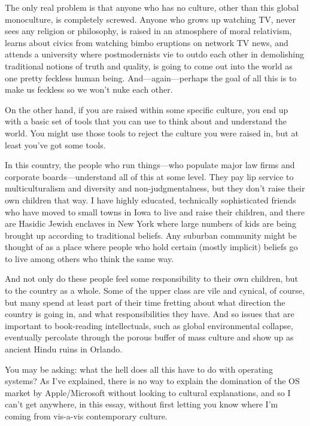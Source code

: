 \documentclass[
  fontsize=11pt,
  paper=landscape,
  twocolumn=true,
  pagesize=pdftex,
  headings=small,
  DIV=15,
  ]{scrartcl}
\begin{document}
The only real problem is that anyone who has no culture, other than this
global monoculture, is completely screwed. Anyone who grows up watching
TV, never sees any religion or philosophy, is raised in an atmosphere of
moral relativism, learns about civics from watching bimbo eruptions on
network TV news, and attends a university where postmodernists vie to
outdo each other in demolishing traditional notions of truth and
quality, is going to come out into the world as one pretty feckless
human being. And---again---perhaps the goal of all this is to make us
feckless so we won't nuke each other.

On the other hand, if you are raised within some specific culture, you
end up with a basic set of tools that you can use to think about and
understand the world. You might use those tools to reject the culture
you were raised in, but at least you've got some tools.

In this country, the people who run things---who populate major law
firms and corporate boards---understand all of this at some level. They
pay lip service to multiculturalism and diversity and
non-judgmentalness, but they don't raise their own children that way. I
have highly educated, technically sophisticated friends who have moved
to small towns in Iowa to live and raise their children, and there are
Hasidic Jewish enclaves in New York where large numbers of kids are
being brought up according to traditional beliefs. Any suburban
community might be thought of as a place where people who hold certain
(mostly implicit) beliefs go to live among others who think the same
way.

And not only do these people feel some responsibility to their own
children, but to the country as a whole. Some of the upper class are
vile and cynical, of course, but many spend at least part of their time
fretting about what direction the country is going in, and what
responsibilities they have. And so issues that are important to
book-reading intellectuals, such as global environmental collapse,
eventually percolate through the porous buffer of mass culture and show
up as ancient Hindu ruins in Orlando.

You may be asking: what the hell does all this have to do with operating
systems? As I've explained, there is no way to explain the domination of
the OS market by Apple/Microsoft without looking to cultural
explanations, and so I can't get anywhere, in this essay, without first
letting you know where I'm coming from vis-a-vis contemporary culture.
\end{document}
